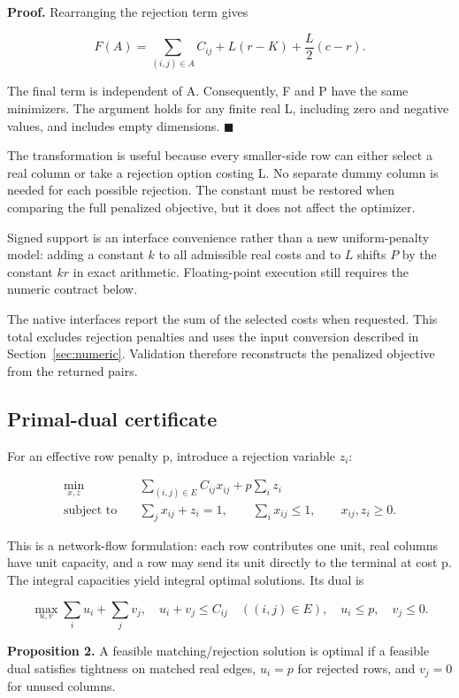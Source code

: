 \documentclass[11pt,a4paper]{article}
\begin{document}
\textbf{Proof.} Rearranging the rejection term gives

\[
F(A)=\sum_{(i,j)\in A}C_{ij}+L(r-K)+\frac{L}{2}(c-r).
\]

The final term is independent of A. Consequently, F and P have the same minimizers. The argument holds for any finite real L, including zero and negative values, and includes empty dimensions. \hfill\ensuremath{\blacksquare}

The transformation is useful because every smaller-side row can either select a real column or take a rejection option costing L. No separate dummy column is needed for each possible rejection. The constant must be restored when comparing the full penalized objective, but it does not affect the optimizer.

Signed support is an interface convenience rather than a new uniform-penalty model: adding a constant \(k\) to all admissible real costs and to \(L\) shifts \(P\) by the constant \(kr\) in exact arithmetic. Floating-point execution still requires the numeric contract below.

The native interfaces report the sum of the selected costs when requested. This total excludes rejection penalties and uses the input conversion described in Section~\ref{sec:numeric}. Validation therefore reconstructs the penalized objective from the returned pairs.

\subsection{Primal-dual certificate}

For an effective row penalty p, introduce a rejection variable \(z_{i}\):

\[
\begin{aligned}
\min_{x,z}\quad&
\sum_{(i,j)\in E}C_{ij}x_{ij}+p\sum_i z_i\\
\text{subject to}\quad&
\sum_j x_{ij}+z_i=1,\qquad
\sum_i x_{ij}\leq1,\qquad x_{ij},z_i\geq0.
\end{aligned}
\tag{4}
\]

This is a network-flow formulation: each row contributes one unit, real columns have unit capacity, and a row may send its unit directly to the terminal at cost p. The integral capacities yield integral optimal solutions. Its dual is

\[
\max_{u,v}\sum_i u_i+\sum_jv_j,
\quad
u_i+v_j\leq C_{ij}\quad((i,j)\in E),\quad u_i\leq p,\quad v_j\leq0.
\tag{5}
\]

\textbf{Proposition 2.} A feasible matching/rejection solution is optimal if a feasible dual satisfies tightness on matched real edges, \(u_{i}=p\) for rejected rows, and \(v_{j}=0\) for unused columns.
\end{document}
